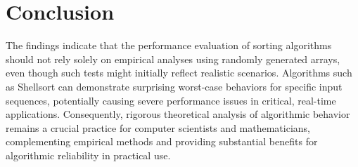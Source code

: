 \section{Conclusion}

The findings indicate that the performance evaluation of sorting algorithms should not rely solely on empirical analyses using randomly generated arrays, even though such tests might initially reflect realistic scenarios.
Algorithms such as Shellsort can demonstrate surprising worst-case behaviors for specific input sequences, potentially causing severe performance issues in critical, real-time applications.
Consequently, rigorous theoretical analysis of algorithmic behavior remains a crucial practice for computer scientists and mathematicians, complementing empirical methods and providing substantial benefits for algorithmic reliability in practical use.
